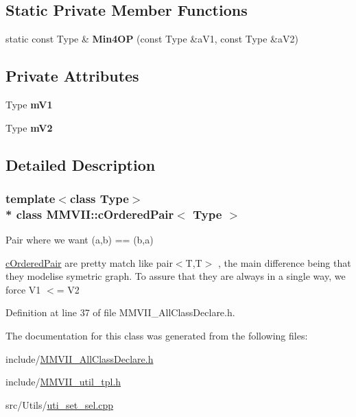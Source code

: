 \subsection*{Static Private Member Functions}
\begin{DoxyCompactItemize}
\item 
static const Type \& {\bfseries Min4\+OP} (const Type \&a\+V1, const Type \&a\+V2)\hypertarget{classMMVII_1_1cOrderedPair_aa6a1d08aa55d1bcaa5a7407e638163a5}{}\label{classMMVII_1_1cOrderedPair_aa6a1d08aa55d1bcaa5a7407e638163a5}

\end{DoxyCompactItemize}
\subsection*{Private Attributes}
\begin{DoxyCompactItemize}
\item 
Type {\bfseries m\+V1}\hypertarget{classMMVII_1_1cOrderedPair_aa8fe77656b0789390c8dfed9ee5c20e7}{}\label{classMMVII_1_1cOrderedPair_aa8fe77656b0789390c8dfed9ee5c20e7}

\item 
Type {\bfseries m\+V2}\hypertarget{classMMVII_1_1cOrderedPair_aea64ed75a1edd11ff107ce75ac73edf2}{}\label{classMMVII_1_1cOrderedPair_aea64ed75a1edd11ff107ce75ac73edf2}

\end{DoxyCompactItemize}


\subsection{Detailed Description}
\subsubsection*{template$<$class Type$>$\\*
class M\+M\+V\+I\+I\+::c\+Ordered\+Pair$<$ Type $>$}

Pair where we want (a,b) == (b,a) 

\hyperlink{classMMVII_1_1cOrderedPair}{c\+Ordered\+Pair} are pretty match like pair$<$\+T,\+T$>$ , the main difference being that they modelise symetric graph. To assure that they are always in a single way, we force V1 $<$= V2 

Definition at line 37 of file M\+M\+V\+I\+I\+\_\+\+All\+Class\+Declare.\+h.



The documentation for this class was generated from the following files\+:\begin{DoxyCompactItemize}
\item 
include/\hyperlink{MMVII__AllClassDeclare_8h}{M\+M\+V\+I\+I\+\_\+\+All\+Class\+Declare.\+h}\item 
include/\hyperlink{MMVII__util__tpl_8h}{M\+M\+V\+I\+I\+\_\+util\+\_\+tpl.\+h}\item 
src/\+Utils/\hyperlink{uti__set__sel_8cpp}{uti\+\_\+set\+\_\+sel.\+cpp}\end{DoxyCompactItemize}
